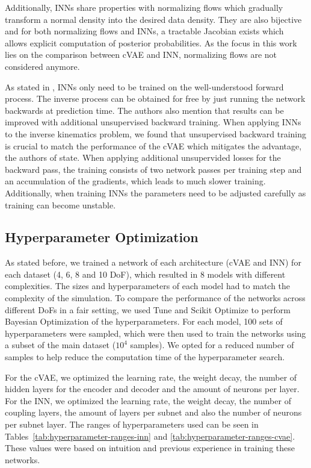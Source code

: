 \documentclass[conference]{IEEEtran}
\begin{document}
Additionally, INNs share properties with normalizing flows \cite{normalizingFlows2010, normalizingFlows2013} which gradually transform a normal density into the desired data density. They are also bijective and for both normalizing flows and INNs, a tractable Jacobian exists which allows explicit computation of posterior probabilities. As the focus in this work lies on the comparison between cVAE and INN, normalizing flows are not considered anymore.

As stated in \cite{Ardizzone2018}, INNs only need to be trained on the well-understood forward process. The inverse process can be obtained for free by just running the network backwards at prediction time. The authors also mention that results can be improved with additional unsupervised backward training. When applying INNs to the inverse kinematics problem, we found that unsupervised backward training is crucial to match the performance of the cVAE which mitigates the advantage, the authors of \cite{Ardizzone2018} state. When applying additional unsupervided losses for the backward pass, the training consists of two network passes per training step and an accumulation of the gradients, which leads to much slower training. Additionally, when training INNs the parameters need to be adjusted carefully as training can become unstable. 

\subsection*{Hyperparameter Optimization}

As stated before, we trained a network of each architecture (cVAE and INN) for each dataset (4, 6, 8 and 10 DoF), which resulted in 8 models with different complexities. The sizes and hyperparameters of each model had to match the complexity of the simulation. To compare the performance of the networks across different DoFs in a fair setting, we used Tune \cite{liaw2018tune} and Scikit Optimize \cite{scikit-optimize} to perform Bayesian Optimization of the hyperparameters. For each model, 100 sets of hyperparameters were sampled, which were then used to train the networks using a subset of the main dataset (\( 10^4 \) samples). We opted for a reduced number of samples to help reduce the computation time of the hyperparameter search. 

For the cVAE, we optimized the learning rate, the weight decay, the number of hidden layers for the encoder and decoder and the amount of neurons per layer. For the INN, we optimized the learning rate, the weight decay, the number of coupling layers, the amount of layers per subnet and also the number of neurons per subnet layer. The ranges of hyperparameters used can be seen in Tables~\ref{tab:hyperparameter-ranges-inn} and \ref{tab:hyperparameter-ranges-cvae}. These values were based on intuition and previous experience in training these networks.
\end{document}
